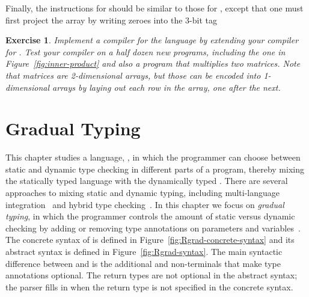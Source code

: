 \documentclass[11pt]{book}
\newtheorem{exercise}[theorem]{Exercise}
\begin{document}
Finally, the instructions for  should be
similar to those for , except that one must
first project the array by writing zeroes into the $3$-bit tag

\begin{exercise}\normalfont

Implement a compiler for the \LangArray{} language by extending your
compiler for \LangLoop{}. Test your compiler on a half dozen new
programs, including the one in Figure~\ref{fig:inner-product} and also
a program that multiplies two matrices. Note that matrices are
2-dimensional arrays, but those can be encoded into 1-dimensional
arrays by laying out each row in the array, one after the next.
  
\end{exercise}


\chapter{Gradual Typing}
\label{ch:Rgrad}

This chapter studies a language, \LangGrad{}, in which the programmer
can choose between static and dynamic type checking in different parts
of a program, thereby mixing the statically typed \LangLoop{} language
with the dynamically typed \LangDyn{}. There are several approaches to
mixing static and dynamic typing, including multi-language
integration~\citep{Tobin-Hochstadt:2006fk,Matthews:2007zr} and hybrid
type checking~\citep{Flanagan:2006mn,Gronski:2006uq}. In this chapter
we focus on \emph{gradual typing}, in which the
programmer controls the amount of static versus dynamic checking by
adding or removing type annotations on parameters and
variables~\citep{Anderson:2002kd,Siek:2006bh}.
%
The concrete syntax of \LangGrad{} is defined in
Figure~\ref{fig:Rgrad-concrete-syntax} and its abstract syntax is defined
in Figure~\ref{fig:Rgrad-syntax}. The main syntactic difference between
\LangLoop{} and \LangGrad{} is the additional  and 
non-terminals that make type annotations optional. The return types
are not optional in the abstract syntax; the parser fills in
 when the return type is not specified in the concrete
syntax.
\end{document}
